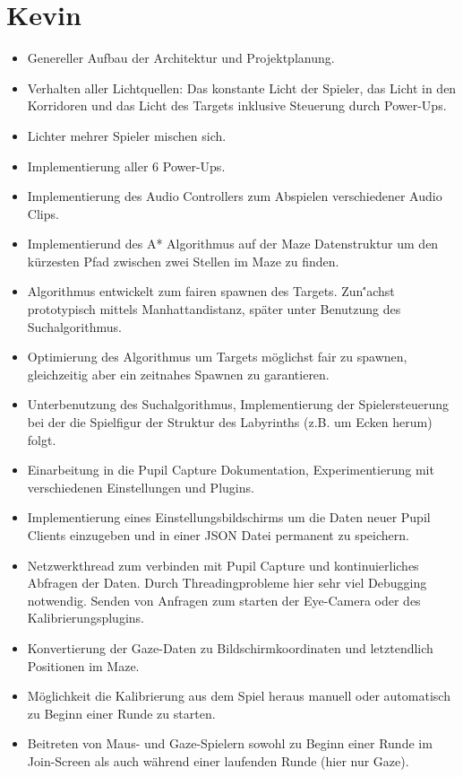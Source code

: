 \documentclass[10pt,a4paper]{article}
\begin{document}
	\section*{Kevin}
		\begin{itemize}
			\item Genereller Aufbau der Architektur und Projektplanung. 
			\item Verhalten aller Lichtquellen: Das konstante Licht der Spieler, das Licht in den Korridoren und das Licht des Targets inklusive Steuerung durch Power-Ups.
			\item Lichter mehrer Spieler mischen sich.
			\item Implementierung aller 6 Power-Ups.
			\item Implementierung des Audio Controllers zum Abspielen verschiedener Audio Clips.
			\item Implementierund des A* Algorithmus auf der Maze Datenstruktur um den k\"urzesten Pfad zwischen zwei Stellen im Maze zu finden.
			\item Algorithmus entwickelt zum fairen spawnen des Targets. Zun\''achst prototypisch mittels Manhattandistanz, sp\"ater unter Benutzung des Suchalgorithmus.
			\item Optimierung des Algorithmus um Targets m\"oglichst fair zu spawnen, gleichzeitig aber ein zeitnahes Spawnen zu garantieren.
			\item Unterbenutzung des Suchalgorithmus, Implementierung der Spielersteuerung bei der die Spielfigur der Struktur des Labyrinths (z.B. um Ecken herum) folgt.
			\item Einarbeitung in die Pupil Capture Dokumentation, Experimentierung mit verschiedenen Einstellungen und Plugins.
			\item Implementierung eines Einstellungsbildschirms um die Daten neuer Pupil Clients einzugeben und in einer JSON Datei permanent zu speichern.
			\item Netzwerkthread zum verbinden mit Pupil Capture und kontinuierliches Abfragen der Daten. Durch Threadingprobleme hier sehr viel Debugging notwendig. Senden von Anfragen zum starten der Eye-Camera oder des Kalibrierungsplugins. 
			\item Konvertierung der Gaze-Daten zu Bildschirmkoordinaten und letztendlich Positionen im Maze.
			\item M\"oglichkeit die Kalibrierung aus dem Spiel heraus manuell oder automatisch zu Beginn einer Runde zu starten.
			\item Beitreten von Maus- und Gaze-Spielern sowohl zu Beginn einer Runde im Join-Screen als auch w\"ahrend einer laufenden Runde (hier nur Gaze).

\end{itemize}
\end{document}
